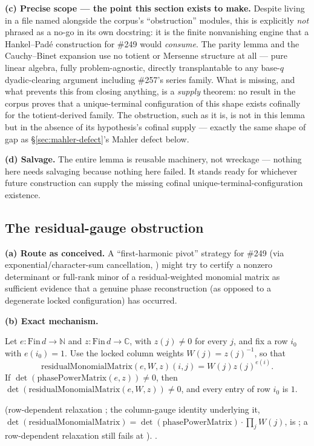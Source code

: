 \textbf{(c) Precise scope — the point this section exists to make.} Despite
living in a file named alongside the corpus's ``obstruction'' modules, this
is explicitly \emph{not} phrased as a no-go in its own docstring: it is the
finite nonvanishing engine that a Hankel--Padé construction for \#249 would
\emph{consume}. The parity lemma and the Cauchy--Binet expansion use no
totient or Mersenne structure at all — pure linear algebra, fully
problem-agnostic, directly transplantable to any base-\(q\) dyadic-clearing
argument including \#257's series family. What is missing, and what
prevents this from closing anything, is a \emph{supply} theorem: no result
in the corpus proves that a unique-terminal configuration of this shape
exists cofinally for the totient-derived family. The obstruction, such as it
is, is not in this lemma but in the absence of its hypothesis's cofinal
supply — exactly the same shape of gap as \S\ref{sec:mahler-defect}'s Mahler
defect below.

\textbf{(d) Salvage.} The entire lemma is reusable machinery, not wreckage —
nothing here needs salvaging because nothing here failed. It stands ready
for whichever future construction can supply the missing cofinal
unique-terminal-configuration existence.

\subsection{The residual-gauge obstruction}

\textbf{(a) Route as conceived.} A ``first-harmonic pivot'' strategy for
\#249 (via exponential/character-sum cancellation,
) might try to certify a nonzero determinant or
full-rank minor of a residual-weighted monomial matrix as sufficient
evidence that a genuine phase reconstruction (as opposed to a degenerate
locked configuration) has occurred.

\textbf{(b) Exact mechanism.}
\begin{prop}
Let \(e:\mathrm{Fin}\,d\to\mathbb N\) and \(z:\mathrm{Fin}\,d\to\mathbb C\),
with \(z(j)\ne0\) for every \(j\), and fix a row \(i_0\) with \(e(i_0)=1\).
Use the locked column weights \(W(j)=z(j)^{-1}\), so that
\[
 \mathrm{residualMonomialMatrix}(e,W,z)(i,j)
 =W(j)z(j)^{e(i)}.
\]
If \(\det(\mathrm{phasePowerMatrix}(e,z))\ne0\), then
\(\det(\mathrm{residualMonomialMatrix}(e,W,z))\ne0\), and every entry
of row \(i_0\) is \(1\).
\end{prop}
(row-dependent relaxation ; the
column-gauge identity underlying it,
\(\det(\mathrm{residualMonomialMatrix}) =
\det(\mathrm{phasePowerMatrix})\cdot\prod_j W(j)\), is
; a row-dependent relaxation still fails at
).  
.

